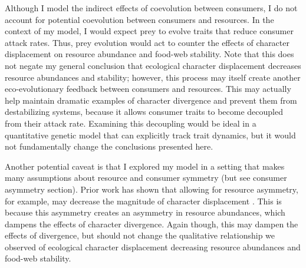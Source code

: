 \documentclass[11pt,]{article}
\begin{document}
Although I model the indirect effects of coevolution between consumers,
I do not account for potential coevolution between consumers and
resources. In the context of my model, I would expect prey to evolve
traits that reduce consumer attack rates. Thus, prey evolution would act
to counter the effects of character displacement on resource abundance
and food-web stability. Note that this does not negate my general
conclusion that ecological character displacement decreases resource
abundances and stability; however, this process may itself create
another eco-evolutionary feedback between consumers and resources. This
may actually help maintain dramatic examples of character divergence and
prevent them from destabilizing systems, because it allows consumer
traits to become decoupled from their attack rate. Examining this
decoupling would be ideal in a quantitative genetic model that can
explicitly track trait dynamics, but it would not fundamentally change
the conclusions presented here.

Another potential caveat is that I explored my model in a setting that
makes many assumptions about resource and consumer symmetry (but see
consumer asymmetry section). Prior work has shown that allowing for
resource asymmetry, for example, may decrease the magnitude of character
displacement \citep{Abrams1986}. This is because this asymmetry creates
an asymmetry in resource abundances, which dampens the effects of
character divergence. Again though, this may dampen the effects of
divergence, but should not change the qualitative relationship we
observed of ecological character displacement decreasing resource
abundances and food-web stability.
\end{document}
